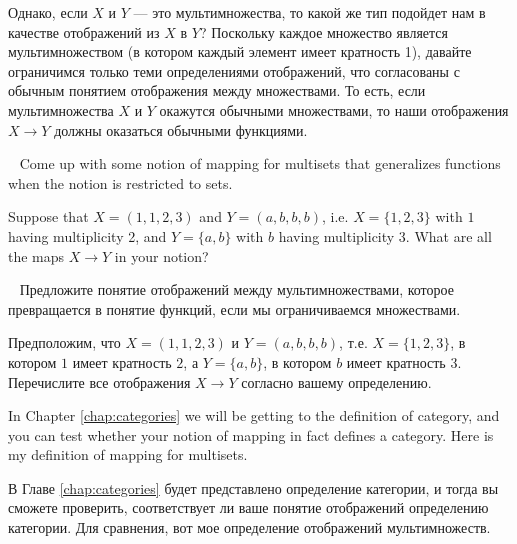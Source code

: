 \documentclass[CT4S-EN-RU]{subfiles}
\begin{document}
\begin{blockRUS}
Однако, если $X$ и $Y$ — это мультимножества, то какой же тип подойдет нам в качестве отображений из $X$ в $Y$? Поскольку каждое множество является мультимножеством (в котором каждый элемент имеет кратность 1), давайте ограничимся только теми определениями отображений, что согласованы с обычным понятием отображения между множествами. То есть, если мультимножества $X$ и $Y$ окажутся обычными множествами, то наши отображения $X\to Y$ должны оказаться обычными функциями. 
\end{blockRUS}

\begin{exerciseENG}\label{exc:multiset 1}~
\sexc Come up with some notion of mapping for multisets that generalizes functions when the notion is restricted to sets. 
\item Suppose that $X=(1,1,2,3)$ and $Y=(a,b,b,b)$, i.e. $X=\{1,2,3\}$ with $1$ having multiplicity 2, and $Y=\{a,b\}$ with $b$ having multiplicity 3. What are all the maps $X\to Y$ in your notion?
\endsexc
\end{exerciseENG}

\begin{exerciseRUS}\label{exc:multiset 1}~
\sexc Предложите понятие отображений между мультимножествами, которое превращается в понятие функций, если мы ограничиваемся множествами. 
\item Предположим, что $X=(1,1,2,3)$ и $Y=(a,b,b,b)$, т.е. $X=\{1,2,3\}$, в котором $1$ имеет кратность $2$, а $Y=\{a,b\}$, в котором $b$ имеет кратность $3$. Перечислите все отображения $X\to Y$ согласно вашему определению.
\endsexc
\end{exerciseRUS}

\begin{blockENG}
In Chapter \ref{chap:categories} we will be getting to the definition of category, and you can test whether your notion of mapping in fact defines a category. Here is my definition of mapping for multisets.
\end{blockENG}

\begin{blockRUS}
В Главе \ref{chap:categories} будет представлено определение категории, и тогда вы сможете проверить, соответствует ли ваше понятие отображений определению категории. Для сравнения, вот мое определение отображений мультимножеств.
\end{blockRUS}
\end{document}
